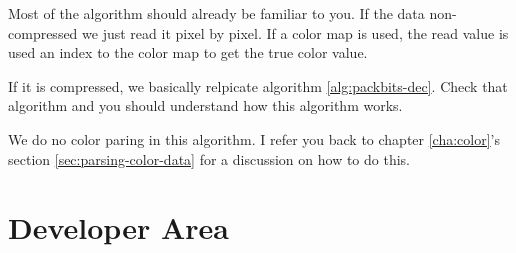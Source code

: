\begin{refsection}
\begin{algorithm}[H]
\begin{algorithmic}[1]



            \EndIf


              \process


            \EndRepeatn

          \Else



              \EndIf

              \process


            \EndRepeatn

          \EndIf
        \Else


          \EndIf

          \process


        \EndIf
      \EndWhile
    \end{algorithmic}
  \end{algorithm}

  Most of the algorithm should already be familiar to you. If the data
  non-compressed we just read it pixel by pixel. If a color map is
  used, the read value is used an index to the color map to get the
  true color value.

  If it is compressed, we basically relpicate algorithm
  \ref{alg:packbits-dec}. Check that algorithm and you should
  understand how this algorithm works.

  We do no color paring in this algorithm. I refer you back to chapter
  \ref{cha:color}'s section \ref{sec:parsing-color-data} for a
  discussion on how to do this.

  \section{Developer Area}


\end{refsection}
